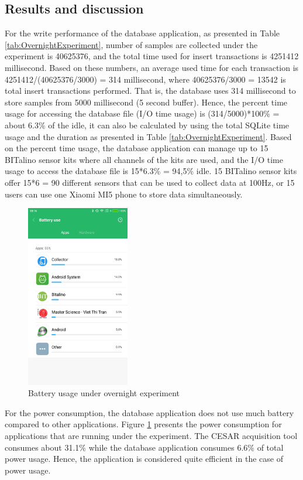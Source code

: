 \subsection{Results and discussion}
For the write performance of the database application, as presented in Table \ref{tab:OvernightExperiment}, number of samples are collected under the experiment is 40625376, and the total time used for insert transactions is 4251412 millisecond. Based on these numbers, an average used time for each transaction is 4251412/(40625376/3000) = 314 millisecond, where 40625376/3000 = 13542 is total insert transactions performed. That is, the database uses 314 millisecond to store samples from 5000 millisecond (5 second buffer). Hence, the percent time usage for accessing the database file (I/O time usage) is (314/5000)*100\% = about 6.3\% of the idle, it can also be calculated by using the total SQLite time usage and the duration as presented in Table \ref{tab:OvernightExperiment}. Based on the percent time usage, the database application can manage up to 15 BITalino sensor kits where all channels of the kits are used, and the I/O time usage to access the database file is 15*6.3\% = 94,5\% idle. 15 BITalino sensor kits offer 15*6 = 90 different sensors that can be used to collect data at 100Hz, or 15 users can use one Xiaomi MI5 phone to store data simultaneously.\\
\begin{figure}
    \centering
    \includegraphics[width=0.4\textwidth]{Figures/PowerMetric.png}
    \caption{Battery usage under overnight experiment}
    \label{fig:Figures/PowerMetric}
\end{figure}
For the power consumption, the database application does not use much battery compared to other applications. Figure \ref{fig:Figures/PowerMetric} presents the power consumption for applications that are running under the experiment. The CESAR acquisition tool consumes about 31.1\% while the database application consumes 6.6\% of total power usage. Hence, the application is considered quite efficient in the case of power usage.\\
